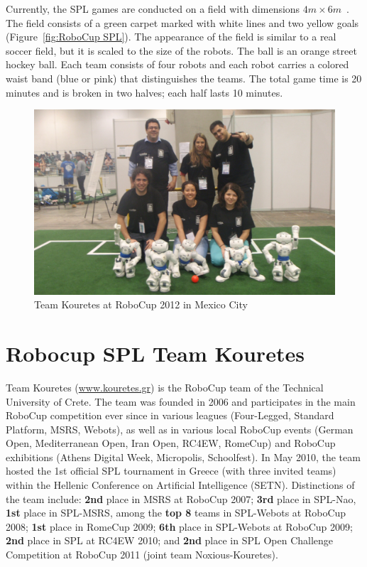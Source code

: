 Currently, the SPL games are conducted on a field with dimensions \(4m \times 6m\)~\cite{SPLrules2012}. The field consists of a green carpet marked with white lines and two yellow goals (Figure~\ref{fig:RoboCup SPL}). The appearance of the field is similar to a real soccer field, but it is scaled to the size of the robots. The ball is an orange street hockey ball. Each team consists of four robots and each robot carries a colored waist band (blue or pink) that distinguishes the teams. The total game time is 20 minutes and is broken in two halves; each half lasts 10 minutes.




\begin{figure}[t!]
	\begin{center}
		\includegraphics[width=.9\textwidth]{Figures/robocup2012-team.jpg}
 		\caption{Team Kouretes at RoboCup 2012 in Mexico City}
 		\label{fig:Kouretes2012}
	\end{center}
\end{figure}

\section{Robocup SPL Team Kouretes}

Team Kouretes (\url{www.kouretes.gr}) is the RoboCup team of the Technical University of Crete. The team was founded in 2006 and participates in the main RoboCup competition ever since in various leagues (Four-Legged, Standard Platform, MSRS, Webots), as well as in various local RoboCup events (German Open, Mediterranean Open, Iran Open, RC4EW, RomeCup) and RoboCup exhibitions (Athens Digital Week, Micropolis, Schoolfest). In May 2010, the team hosted the 1st official SPL tournament in Greece (with three invited teams) within the Hellenic Conference on Artificial Intelligence (SETN). Distinctions of the team include: {\bf 2nd} place in MSRS at RoboCup 2007; {\bf 3rd} place in SPL-Nao, {\bf 1st} place in SPL-MSRS, among the {\bf top 8} teams in SPL-Webots at RoboCup 2008; {\bf 1st} place in RomeCup 2009; {\bf 6th} place in SPL-Webots at RoboCup 2009; {\bf 2nd} place in SPL at RC4EW 2010; and {\bf 2nd} place in SPL Open Challenge Competition at RoboCup 2011 (joint team Noxious-Kouretes).

